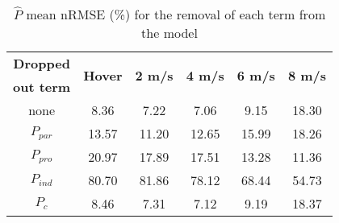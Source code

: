 
\begin{table}[ht]
	\caption{$\hat{P}$ mean nRMSE (\%) for the removal of each term from the model}
	\centering
	\begin{tabular*}{0.4\textwidth}{cccccc}
		\toprule
		\textbf{Dropped} & \multirow{2}{*}{\textbf{Hover}} & \multirow{2}{*}{\textbf{2 m/s}} & \multirow{2}{*}{\textbf{4 m/s}} & \multirow{2}{*}{\textbf{6 m/s}} & \multirow{2}{*}{\textbf{8 m/s}} \\
		\textbf{out term} & & & & & \\
		\midrule
		none        & 8.36     & 7.22   & 7.06  & 9.15   & 18.30 \\
		$P_{par}$ & 13.57   & 11.20  & 12.65 & 15.99 & 18.26 \\
		$P_{pro}$ & 20.97   & 17.89 & 17.51 & 13.28  & 11.36 \\
		$P_{ind}$ & 80.70   & 81.86 & 78.12 & 68.44 & 54.73 \\
		$P_{c}$    & 8.46     & 7.31   & 7.12   & 9.19   & 18.37  \\
		\bottomrule 
	\end{tabular*}
	\label{tab:AblationRMSE}
\end{table}
